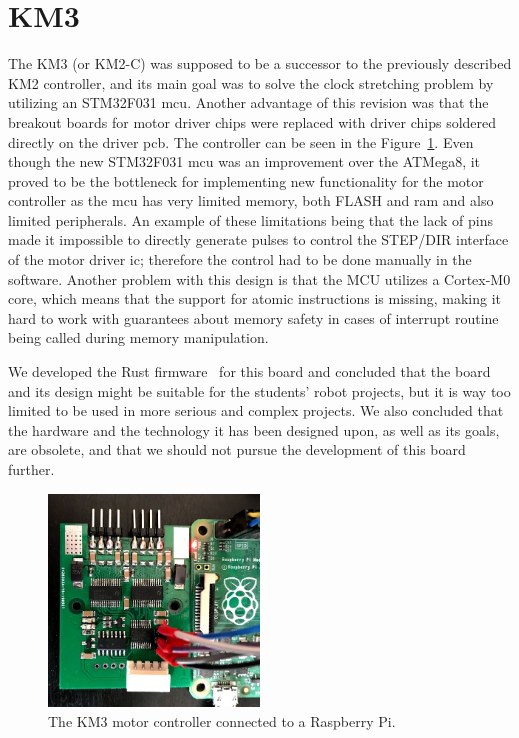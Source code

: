 \newpage
\section{KM3}
\label{sec:km3}
The KM3 (or KM2-C) was supposed to be a successor to the previously described KM2 controller, and its main goal was to solve the clock stretching problem by utilizing an STM32F031 \acs{mcu}.
Another advantage of this revision was that the breakout boards for motor driver chips were replaced with driver chips soldered directly on the driver \acs{pcb}.
The controller can be seen in the Figure~\ref{fig:km3}.
Even though the new STM32F031 \acs{mcu} was an improvement over the ATMega8, it proved to be the bottleneck for implementing new functionality for the motor controller as the \acs{mcu} has very limited memory, both FLASH and \acs{ram} and also limited peripherals.
An example of these limitations being that the lack of pins made it impossible to directly generate pulses to control the STEP/DIR interface of the motor driver \acs{ic}; therefore the control had to be done manually in the software.
Another problem with this design is that the MCU utilizes a Cortex-M0 core, which means that the support for atomic instructions is missing, making it hard to work with guarantees about memory safety in cases of interrupt routine being called during memory manipulation.

We developed the Rust firmware~\cite{hybl_robotics-butkm3-rs_2020} for this board and concluded that the board and its design might be suitable for the students' robot projects, but it is way too limited to be used in more serious and complex projects.
We also concluded that the hardware and the technology it has been designed upon, as well as its goals, are obsolete, and that we should not pursue the development of this board further.

\begin{figure}[H]
    \centering
    \includegraphics[width=0.5\textwidth]{obrazky/km3}
    \caption{The KM3 motor controller connected to a Raspberry Pi.}
    \label{fig:km3}
\end{figure}

